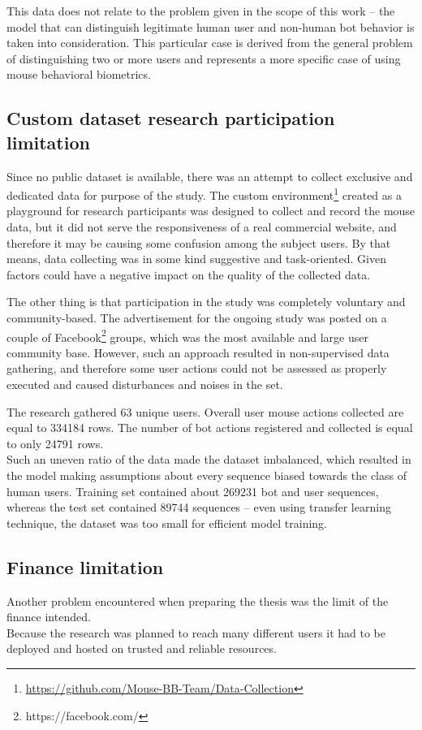 This data does not relate to the problem given in the scope of this work – the model that can distinguish legitimate human user and non-human bot behavior is taken into consideration. This particular case is derived from the general problem of distinguishing two or more users and represents a more specific case of using mouse behavioral biometrics.

\subsection{Custom dataset research participation limitation}\label{subsec:custom-dataset-research}
Since no public dataset is available, there was an attempt to collect exclusive and dedicated data for purpose of the study.
The custom environment\footnote{\url{https://github.com/Mouse-BB-Team/Data-Collection}} created as a playground for research participants was designed to collect and record the mouse data, but it did not serve the responsiveness of a real commercial website, and therefore it may be causing some confusion among the subject users. By that means, data collecting was in some kind suggestive and task-oriented. Given factors could have a negative impact on the quality of the collected data.

The other thing is that participation in the study was completely voluntary and community-based.
The advertisement for the ongoing study was posted on a couple of Facebook\footnote{https://facebook.com/} groups, which was the most available and large user community base. However, such an approach resulted in non-supervised data gathering, and therefore some user actions could not be assessed as properly executed and caused disturbances and noises in the set.

The research gathered \num{63} unique users.
Overall user mouse actions collected are equal to \num{334184} rows.
The number of bot actions registered and collected is equal to only \num{24791} rows.\\
Such an uneven ratio of the data made the dataset imbalanced, which resulted in the model making assumptions about every sequence biased towards the class of human users.
Training set contained about \num{269231} bot and user sequences, whereas the test set contained \num{89744} sequences – even using transfer learning technique, the dataset was too small for efficient model training.

\subsection{Finance limitation}\label{subsec:finance-limitation}
Another problem encountered when preparing the thesis was the limit of the finance intended.\\
Because the research was planned to reach many different users it had to be deployed and hosted on trusted and reliable resources.


